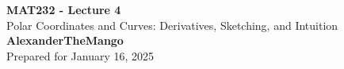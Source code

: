 \begin{titlepage}
    \null %
    \vfill
    \begin{center}
        {\fontsize{40}{48}\selectfont \bfseries MAT232 - Lecture 4}
        \vspace{20pt} \\
        {\LARGE Polar Coordinates and Curves: Derivatives, Sketching, and Intuition} \\
        \vspace{20pt}
        \textbf{AlexanderTheMango}
        \vspace{8pt}
        \\ Prepared for January 16, 2025
    \end{center}
    \vfill
\end{titlepage}
